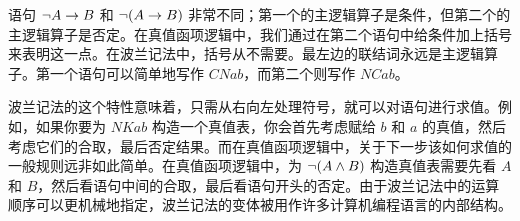 语句 $\neg A\rightarrow B$ 和 $\neg (A\rightarrow B)$ 非常不同；第一个的主逻辑算子是条件，但第二个的主逻辑算子是否定。在真值函项逻辑中，我们通过在第二个语句中给条件加上括号来表明这一点。在波兰记法中，括号从不需要。最左边的联结词永远是主逻辑算子。第一个语句可以简单地写作 $CNab$，而第二个则写作 $NCab$。

波兰记法的这个特性意味着，只需从右向左处理符号，就可以对语句进行求值。例如，如果你要为 $NKab$ 构造一个真值表，你会首先考虑赋给 $b$ 和 $a$ 的真值，然后考虑它们的合取，最后否定结果。而在真值函项逻辑中，关于下一步该如何求值的一般规则远非如此简单。在真值函项逻辑中，为 $\neg(A\wedge B)$ 构造真值表需要先看 $A$ 和 $B$，然后看语句中间的合取，最后看语句开头的否定。由于波兰记法中的运算顺序可以更机械地指定，波兰记法的变体被用作许多计算机编程语言的内部结构。